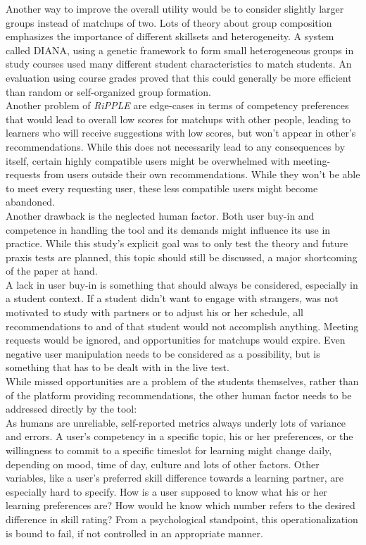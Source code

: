 \documentclass[conference]{IEEEtran}
\begin{document}
Another way to improve the overall utility would be to consider slightly larger groups instead of matchups of two. Lots of theory about group composition emphasizes the importance of different skillsets and heterogeneity. \cite{olakanmi2017group, blumenfeld1996learning, manske2015using} A system called DIANA, using a genetic framework to form small heterogeneous groups in study courses used many different student characteristics to match students. An evaluation using course grades proved that this could generally be more efficient than random or self-organized group formation. \cite{moreno2012genetic}\\
Another problem of \textit{RiPPLE} are edge-cases in terms of competency preferences that would lead to overall low scores for matchups with other people, leading to learners who will receive suggestions with low scores, but won't appear in other's recommendations. While this does not necessarily lead to any consequences by itself, certain highly compatible users might be overwhelmed with meeting-requests from users outside their own recommendations. While they won't be able to meet every requesting user, these less compatible users might become abandoned.\\
Another drawback is the neglected human factor. Both user buy-in and competence in handling the tool and its demands might influence its use in practice. While this study's explicit goal was to only test the theory and future praxis tests are planned, this topic should still be discussed, a major shortcoming of the paper at hand.\\
A lack in user buy-in is something that should always be considered, especially in a student context. If a student didn't want to engage with strangers, was not motivated to study with partners or to adjust his or her schedule, all recommendations to and of that student would not accomplish anything. Meeting requests would be ignored, and opportunities for matchups would expire. Even negative user manipulation needs to be considered as a possibility, but is something that has to be dealt with in the live test.\\
While missed opportunities are a problem of the students themselves, rather than of the platform providing recommendations, the other human factor needs to be addressed directly by the tool:\\
As humans are unreliable, self-reported metrics always underly lots of variance and errors. A user's competency in a specific topic, his or her preferences, or the willingness to commit to a specific timeslot for learning might change daily, depending on mood, time of day, culture and lots of other factors. \cite{lee2002cultural} \cite{sorensen2008measuring} Other variables, like a user's preferred skill difference towards a learning partner, are especially hard to specify. How is a user supposed to know what his or her learning preferences are? How would he know which number refers to the desired difference in skill rating? From a psychological standpoint, this operationalization is bound to fail, if not controlled in an appropriate manner. \cite{gonyea2005self}\\
\end{document}
